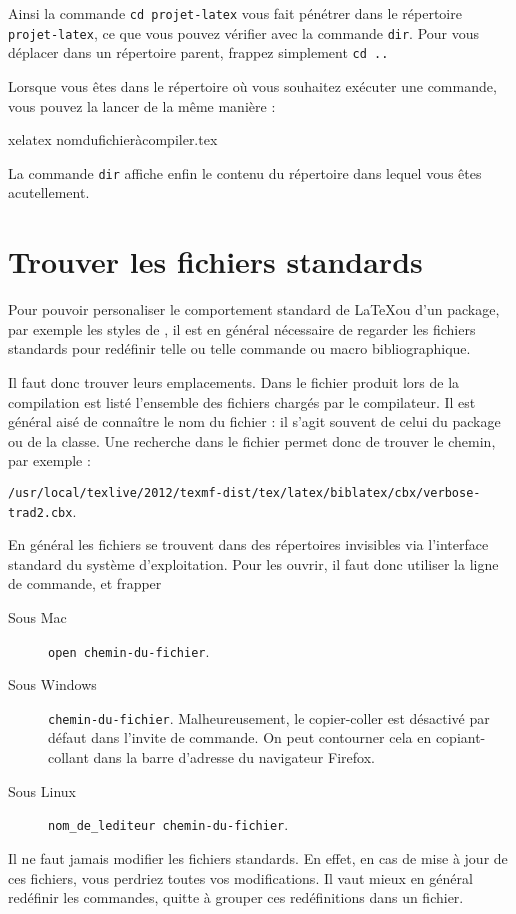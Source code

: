 Ainsi la commande \verb|cd projet-latex| vous fait pénétrer dans le
répertoire \verb|projet-latex|, ce que vous pouvez vérifier avec la
commande \verb|dir|. Pour vous déplacer dans un répertoire parent, frappez
simplement \verb|cd ..|

Lorsque vous êtes dans le répertoire où vous souhaitez exécuter une
commande, vous pouvez la lancer de la même manière :

\begin{bashcode}
xelatex nomdufichieràcompiler.tex
\end{bashcode}

La commande \verb|dir| affiche enfin le contenu du répertoire dans lequel vous êtes acutellement.

\section{Trouver les fichiers standards}\label{trouverfichier}

Pour pouvoir personaliser le comportement standard de \LaTeX ou d'un package, par exemple les styles de , il est en général nécessaire de regarder les fichiers standards pour redéfinir telle ou telle commande ou macro bibliographique. 

Il faut donc trouver leurs emplacements. Dans le fichier  produit lors de la compilation est listé l'ensemble des fichiers chargés par le compilateur. Il est général aisé de connaître le nom du fichier : il s'agit souvent de celui du package ou de la classe. Une recherche dans le fichier permet donc de trouver le chemin, par exemple : 

\noindent\verb|/usr/local/texlive/2012/texmf-dist/tex/latex/biblatex/cbx/verbose-trad2.cbx|.

En général les fichiers se trouvent dans des répertoires invisibles via l'interface standard du système d'exploitation. Pour les ouvrir, il faut donc utiliser la ligne de commande, et frapper 
\begin{description}
\item[Sous Mac]\verb|open chemin-du-fichier|.
\item[Sous Windows] \verb|chemin-du-fichier|.  Malheureusement, le copier-coller est désactivé par défaut dans l'invite de commande. On peut contourner cela en copiant-collant dans la barre d'adresse du navigateur Firefox.
\item[Sous Linux] \verb|nom_de_lediteur chemin-du-fichier|.
\end{description}
\begin{attention}
Il ne faut jamais modifier les fichiers standards. En effet, en cas de mise à jour de ces fichiers, vous perdriez toutes vos modifications. Il vaut mieux en général redéfinir les commandes, quitte à grouper ces redéfinitions dans un fichier.
\end{attention}

